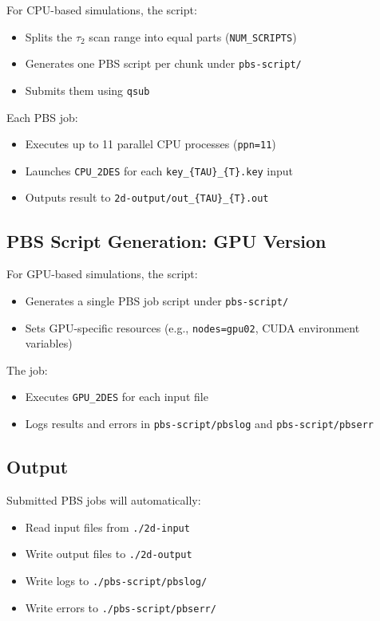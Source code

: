 \documentclass{article}
\begin{document}
For CPU-based simulations, the script:
\begin{itemize}
    \item Splits the \(\tau_2\) scan range into equal parts (\texttt{NUM\_SCRIPTS})
    \item Generates one PBS script per chunk under \texttt{pbs-script/}
    \item Submits them using \texttt{qsub}
\end{itemize}

Each PBS job:
\begin{itemize}
    \item Executes up to 11 parallel CPU processes (\texttt{ppn=11})
    \item Launches \texttt{CPU\_2DES} for each \texttt{key\_\{TAU\}\_\{T\}.key} input
    \item Outputs result to \texttt{2d-output/out\_\{TAU\}\_\{T\}.out}
\end{itemize}

\subsection*{PBS Script Generation: GPU Version}

For GPU-based simulations, the script:
\begin{itemize}
    \item Generates a single PBS job script under \texttt{pbs-script/}
    \item Sets GPU-specific resources (e.g., \texttt{nodes=gpu02}, CUDA environment variables)
\end{itemize}

The job:
\begin{itemize}
    \item Executes \texttt{GPU\_2DES} for each input file
    \item Logs results and errors in \texttt{pbs-script/pbslog} and \texttt{pbs-script/pbserr}
\end{itemize}

\subsection*{Output}

Submitted PBS jobs will automatically:
\begin{itemize}
    \item Read input files from \texttt{./2d-input}
    \item Write output files to \texttt{./2d-output}
    \item Write logs to \texttt{./pbs-script/pbslog/}
    \item Write errors to \texttt{./pbs-script/pbserr/}
\end{itemize}
\end{document}
